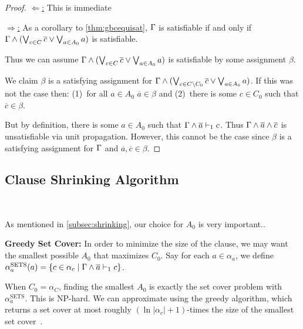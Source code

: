 \begin{proof}
    \underline{$\Leftarrow$:} This is immediate


    \underline{$\Rightarrow$:}  As a corollary to \autoref{thm:gbcequisat},
    $\Gamma$ is satisfiable if and only if $\Gamma \land (\bigvee_{c \in C}
    \overline{c} \lor \bigvee_{a \in A_0} a)$ is satisfiable.

    Thus we can assume $\Gamma \land (\bigvee_{c \in C} \overline{c} \lor
    \bigvee_{a \in A_0} a)$ is satisfiable by some assignment
    $\beta$.

    We claim $\beta$ is a satisfying assignment for $\Gamma \land (\bigvee_{c \in
    C \backslash C_0} \overline{c} \lor \bigvee_{a \in A_0} a)$. If this was not
    the case then: (1)~for all $a \in A_0$ $\overline{a} \in \beta$ and (2)~there
    is some $c \in C_0$ such that $\overline{c} \in \beta$. 

    But by definition, there is some $a \in A_0$ such that
    $\Gamma \land \overline{a} \vdash_1 c$. Thus $\Gamma \land \overline{a} \land
    \overline{c}$ is unsatisfiable via unit propagation. However, this cannot be
    the case since $\beta$ is a satisfying assignment for $\Gamma$ and
    $\overline{a}, \overline{c} \in \beta$.
\end{proof}


\subsection{Clause Shrinking Algorithm}~\label{subsec:sym}

As mentioned in \autoref{subsec:shrinking}, our choice for $A_0$ is very important.. 


\noindent \textbf{Greedy Set Cover:} %
In order to minimize the size of the clause, we may want the smallest possible $A_0$ that maximizes $C_0$. Say for each $a \in \alpha_a$, we define $\alpha_a^\mathrm{SETS}(a) = \{ c \in \alpha_c \; | \; \Gamma \land \overline{a} \vdash_1 c\}$. 

When $C_0 = \alpha_C$, finding the smallest $A_0$ is exactly the set cover problem with $\alpha_a^\mathrm{SETS}$. This is NP-hard. We can approximate using the greedy algorithm, which returns a set cover at most roughly $(\ln |\alpha_c| + 1)$-times the size of the smallest set cover~\cite{greedysetcover}. 


